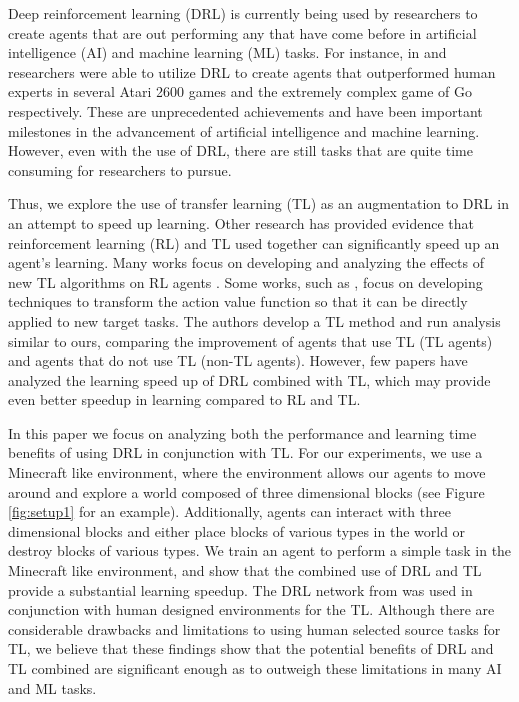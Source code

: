 \documentclass{llncs}
\begin{document}

Deep reinforcement learning (DRL) is currently being used by researchers to create agents that are out performing any that have come before in artificial intelligence (AI) and machine learning (ML) tasks.
For instance, in \citep{mnih2015human} and \citep{silver2016mastering} researchers were able to utilize DRL to create agents that outperformed human experts in several Atari 2600 games and the extremely complex game of Go respectively.
These are unprecedented achievements and have been important milestones in the advancement of artificial intelligence and machine learning.
However, even with the use of DRL, there are still tasks that are quite time consuming for researchers to pursue. 

Thus, we explore the use of transfer learning (TL) as an augmentation to DRL in an attempt to speed up learning. 
Other research has provided evidence that reinforcement learning (RL) and TL used together can significantly speed up an agent's learning. 
Many works focus on developing and analyzing the effects of new TL algorithms on RL agents \citep{taylor2007cross,taylor2008autonomous,ramon2007transfer}. 
Some works, such as \citep{taylor2007transfer}, focus on developing techniques to transform the action value function so that it can be directly applied to new target tasks.
The authors develop a TL method and run analysis similar to ours, comparing the improvement of agents that use TL (TL agents) and agents that do not use TL (non-TL agents).
However, few papers have analyzed the learning speed up of DRL combined with TL, which may provide even better speedup in learning compared to RL and TL. 

In this paper we focus on analyzing both the performance and learning time benefits of using DRL in conjunction with TL. 
For our experiments, we use a Minecraft like environment, where the environment allows our agents to move around and explore a world composed of three dimensional blocks (see Figure \ref{fig:setup1} for an example).
Additionally, agents can interact with three dimensional blocks and either place blocks of various types in the world or destroy blocks of various types.
We train an agent to perform a simple task in the Minecraft like environment, and show that the combined use of DRL and TL provide a substantial learning speedup.
The DRL network from \citep{mnih2015human} was used in conjunction with human designed environments for the TL.
Although there are considerable drawbacks and limitations to using human selected source tasks for TL, we believe that these findings show that the potential benefits of DRL and TL combined are significant enough as to outweigh these limitations in many AI and ML tasks. 
\end{document}
